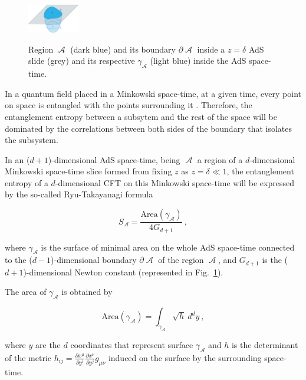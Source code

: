 \documentclass[twocolumn]{revtex4}
\providecommand{\eq}[2]{
    \begin{equation}
        #2
    \label{eq:#1}
    \end{equation}
}
\DeclareMathOperator{\calA}{\mathcal{A}}
\begin{document}
\begin{figure}
    \centering
    \includegraphics[width=0.2\textwidth]{Imatges/Extern/EE_AdS-CFT.png}
\label{fig:EE_AdS-CFT}
\caption{Region $\calA$ (dark blue) and its boundary $\partial \calA$ inside a $z=\delta$ AdS slide (grey) and its respective $\gamma_{\calA}$ (light blue) inside the AdS space-time.}
\end{figure}

In a quantum field placed in a Minkowski space-time, at a given time, every point on space is entangled with the points surrounding it \cite{nishioka_entanglement_2018}. Therefore, the entanglement entropy between a subsytem and the rest of the space will be dominated by the correlations between both sides of the boundary that isolates the subsystem.



In an ($d+1$)-dimensional AdS space-time, being $\calA$ a region of a $d$-dimensional Minkowski space-time slice formed from fixing $z$ as $z=\delta \ll 1$, the entanglement entropy of a $d$-dimensional CFT on this Minkowski space-time will be expressed by the so-called Ryu-Takayanagi formula
\eq{EE_RT}{
    S_{\calA} = \frac{ \text{Area}(\gamma_{\calA}) }{ 4 G_{d+1} } \ ,
}
\cite{ryu_holographic_2008} where $\gamma_{\calA}$ is the surface of minimal area on the whole AdS space-time connected to the ($d-1$)-dimensional boundary $\partial \calA$ of the region $\calA$, and $G_{d+1}$ is the ($d+1$)-dimensional Newton constant (represented in Fig.~\ref{fig:EE_AdS-CFT}).

The area of $\gamma_{\calA}$ is obtained by
\eq{EE_RT-area}{
    \text{Area}(\gamma_{\calA}) = \int_{\gamma_{\calA}} \sqrt{h} \ d^{d}y \ ,
}
where $y$ are the $d$ coordinates that represent surface $\gamma_{\calA}$ and $h$ is the determinant of the metric $h_{ij} = \frac{\partial x^\mu}{\partial y^i} \frac{\partial x^\nu}{\partial y^j} g_{\mu\nu}$ induced on the surface by the surrounding space-time.
\end{document}
